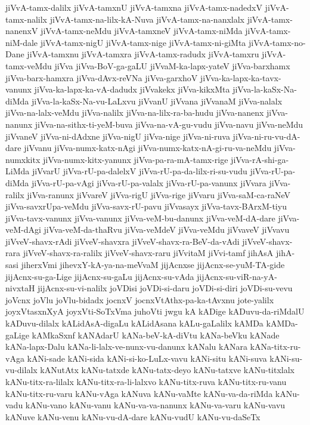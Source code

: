 {jiVvA-tamx-dalilx
jiVvA-tamxnU
jiVvA-tamxna
jiVvA-tamx-nadedxV
jiVvA-tamx-nalilx
jiVvA-tamx-na-lilx-kA-Nuva
jiVvA-tamx-na-nanxlalx
jiVvA-tamx-nanenxV
jiVvA-tamx-neMdu
jiVvA-tamxneV
jiVvA-tamx-niMda
jiVvA-tamx-niM-dale
jiVvA-tamx-nigU
jiVvA-tamx-nige
jiVvA-tamx-ni-giMta
jiVvA-tamx-no-Dane
jiVvA-tamxnu
jiVvA-tamxra
jiVvA-tamx-radudx
jiVvA-tamxru
jiVvA-tamx-veMdu
jiVva
jiVva-BoV-ga-gaLU
jiVvaM-ka-lapx-yateV
jiVva-barxhamx
jiVva-barx-hamxra
jiVva-dAvx-reVNa
jiVva-garxhoV
jiVva-ka-lapx-ka-tavx-vanunx
jiVva-ka-lapx-ka-vA-dadudx
jiVvakekx
jiVva-kikxMta
jiVva-la-kaSx-Na-diMda
jiVva-la-kaSx-Na-vu-LaLxvu
jiVvanU
jiVvana
jiVvanaM
jiVva-nalalx
jiVva-na-lalx-veMdu
jiVva-nalilx
jiVva-na-lilx-ra-ba-hudu
jiVva-nanenx
jiVva-nanunx
jiVva-na-sithx-ti-yeM-buva
jiVva-na-vA-gu-vudu
jiVva-navu
jiVva-neMdu
jiVvaneV
jiVva-ni-dAdxne
jiVva-nigU
jiVva-nige
jiVva-ni-ruva
jiVva-ni-ru-vu-dA-dare
jiVvanu
jiVva-numx-katx-nAgi
jiVva-numx-katx-nA-gi-ru-va-neMdu
jiVva-numxkitx
jiVva-numx-kitx-yanunx
jiVva-pa-ra-mA-tamx-rige
jiVva-rA-shi-ga-LiMda
jiVvarU
jiVva-rU-pa-dalelxV
jiVva-rU-pa-da-lilx-ri-su-vudu
jiVva-rU-pa-diMda
jiVva-rU-pa-vAgi
jiVva-rU-pa-valalx
jiVva-rU-pa-vanunx
jiVvara
jiVva-ralilx
jiVva-ranunx
jiVvareV
jiVva-rigU
jiVva-rige
jiVvaru
jiVva-saM-ca-raNeV
jiVva-savxrUpa-veMdu
jiVva-savx-rU-pavu
jiVvasayx
jiVva-tavx-BArxM-tiyu
jiVva-tavx-vanunx
jiVva-vanunx
jiVva-veM-bu-danunx
jiVva-veM-dA-dare
jiVva-veM-dAgi
jiVva-veM-da-thaRvu
jiVva-veMdeV
jiVva-veMdu
jiVvaveV
jiVvavu
jiVveV-shavx-rAdi
jiVveV-shavxra
jiVveV-shavx-ra-BeV-da-vAdi
jiVveV-shavx-rara
jiVveV-shavx-ra-ralilx
jiVveV-shavx-raru
jiVvitaM
jiVvi-tamf
jihAsA
jihA-sasi
jiherxVmi
jihevxY-kA-ya-na-meVvaM
jijAcnxse
jijAcnx-se-yuM-TA-gide
jijAcnx-su-ga-Lige
jijAcnx-su-gaLu
jijAcnx-su-vAda
jijAcnx-su-viR-na-yA-nivxtaH
jijAcnx-su-vi-nalilx
joVDisi
joVDi-si-daru
joVDi-si-diri
joVDi-su-vevu
joVcnx
joVlu
joVlu-bidadx
jocnxV
jocnxVtAthx-pa-ka-tAvxnu
jote-yalilx
joyxVtasxnXyA
joyxVti-SoTxVma
juhoVti
jwgu
kA
kADige
kADuvu-da-riMdalU
kADuvu-dilalx
kALidAsA-digaLu
kALidAsana
kALu-gaLalilx
kAMDa
kAMDa-gaLige
kAMkaSxnf
kANAdarU
kANa-beV-kA-diVtu
kANa-beVku
kANade
kANa-lapx-Dalu
kANa-li-lalx-ve-nunx-vu-danunx
kANalu
kANara
kANa-titx-ru-vAga
kANi-sade
kANi-sida
kANi-si-ko-LuLx-vavu
kANi-situ
kANi-suva
kANi-su-vu-dilalx
kANutAtx
kANu-tatxde
kANu-tatx-deyo
kANu-tatxve
kANu-titxlalx
kANu-titx-ra-lilalx
kANu-titx-ra-li-lalxvo
kANu-titx-ruva
kANu-titx-ru-vanu
kANu-titx-ru-varu
kANu-vAga
kANuva
kANu-vaMte
kANu-va-da-riMda
kANu-vadu
kANu-vano
kANu-vanu
kANu-va-va-nanunx
kANu-va-varu
kANu-vavu
kANuve
kANu-venu
kANu-vu-dA-dare
kANu-vudU
kANu-vu-daSeTx
}

